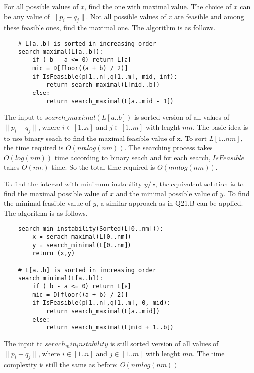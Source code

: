 \documentclass[12pt,a4paper]{article}
\newcommand{\question}[1]{\bigskip\noindent{\textbf{Q{#1} solution}}}
\begin{document}
\question{21.B}

For all possible values of $x$, find the one with maximal value. The choice of $x$ can be any value of $\|p_i - q_j\|$. Not all possible values of $x$ are feasible and among these feasible ones, find the maximal one. The algorithm is as follows.
\begin{lstlisting}
	# L[a..b] is sorted in increasing order
	search_maximal(L[a..b]):
		if ( b - a <= 0) return L[a]
		mid = D[floor((a + b) / 2)]
		if IsFeasible(p[1..n],q[1..m], mid, inf):
			return search_maximal(L[mid..b])
		else:
			return search_maximal(L[a..mid - 1])
\end{lstlisting}

The input to $search\_maximal(L[a..b])$ is sorted version of all values of $\|p_i - q_j\|$, where $i \in [1..n]$ and $j \in [1..m]$ with lenght $mn$. The basic idea is to use binary seach to find the maximal feasible value of x. To sort $L[1..nm]$, the time required is $O(nmlog(nm))$. The searching process takes $O(log(nm))$ time according to binary seach and for each search, $IsFeasible$ takes $O(nm)$ time. So the total time required is $O(nmlog(nm))$.

\question{21.C}

To find the interval with minimum instability $y / x$, the equivalent solution is to find the maximal possible value of $x$ and the minimal possible value of $y$. To find the minimal feasible value of $y$, a similar approach as in Q21.B can be applied. The algorithm is as follows.

\begin{lstlisting}
	search_min_instability(Sorted(L[0..nm])):
		x = serach_maximal(L[0..nm])
		y = search_minimal(L[0..nm])
		return (x,y)
	
	# L[a..b] is sorted in increasing order
	search_minimal(L[a..b]):
		if ( b - a <= 0) return L[a]
		mid = D[floor((a + b) / 2)]
		if IsFeasible(p[1..n],q[1..m], 0, mid):
			return search_maximal(L[a..mid])
		else:
			return search_maximal(L[mid + 1..b])
\end{lstlisting}

The input to $serach_min_instability$ is still sorted version of all values of $\|p_i - q_j\|$, where $i \in [1..n]$ and $j \in [1..m]$ with lenght $mn$. The time complexity is still the same as before: $O(nmlog(nm))$
\end{document}
